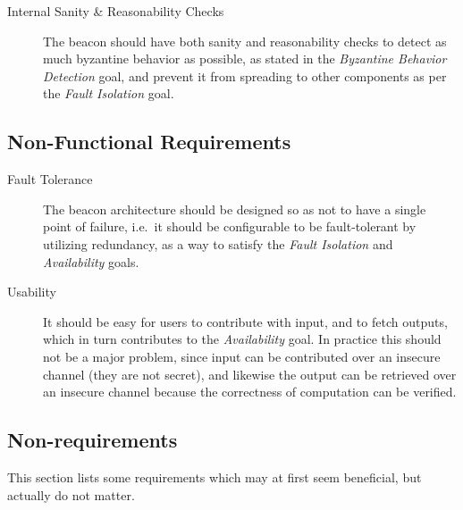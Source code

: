 \begin{description}


\item [Internal Sanity \& Reasonability Checks]
The beacon should have both sanity and reasonability checks to detect as much byzantine behavior as possible, as stated in the \emph{Byzantine Behavior Detection} goal, and prevent it from spreading to other components as per the \emph{Fault Isolation} goal.

\end{description}

\subsection{Non-Functional Requirements}
\label{sub:non_functional_requirements}

\begin{description}
    \item[Fault Tolerance]
The beacon architecture should be designed so as not to have a single point of failure, i.e.\ it should be configurable to be fault-tolerant by utilizing redundancy, as a way to satisfy the \emph{Fault Isolation} and \emph{Availability} goals.


    \item[Usability]
It should be easy for users to contribute with input, and to fetch outputs, which in turn contributes to the \emph{Availability} goal.
In practice this should not be a major problem, since input can be contributed over an insecure channel (they are not secret), and likewise the output can be retrieved over an insecure channel because the correctness of computation can be verified.
\end{description}

\subsection{Non-requirements}
This section lists some requirements which may at first seem beneficial, but actually do not matter.

